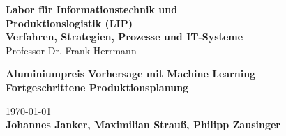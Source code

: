 	\thispagestyle{empty}

    \begin{singlespacing}
	\begin{center}
		\large
		\textcolor{lip}{\textbf{Labor für Informationstechnik und\\Produktionslogistik (LIP)}}
		\small
		\textbf{\\Verfahren, Strategien, Prozesse und IT-Systeme}
		\\Professor Dr. Frank Herrmann
	\end{center}
    \end{singlespacing}
		\onehalfspacing

		\begin{center}

			\vspace*{4cm} %
			\Large
			\textbf{Aluminiumpreis Vorhersage mit Machine Learning}\\ %
			\large
			\textbf{Fortgeschrittene Produktionsplanung}\\ %

			\vspace*{8cm} %
			\normalsize
			\begin{center}
				\today\\
				\textbf{Johannes Janker, Maximilian Strauß, Philipp Zausinger} %

			\end{center}
		\end{center}
